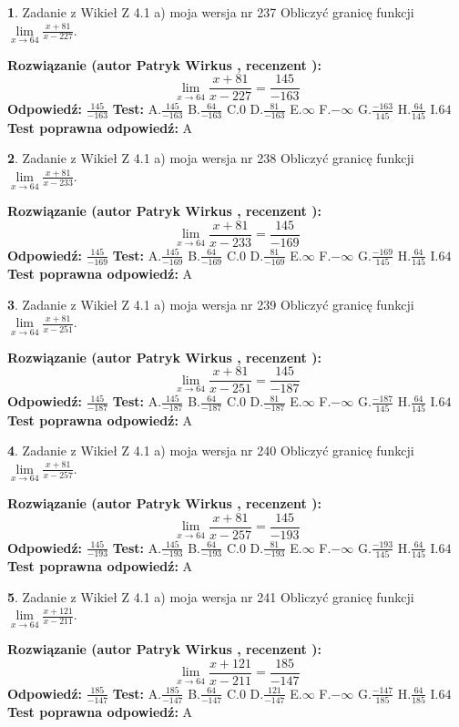 \documentclass[12pt, a4paper]{article}
\theoremstyle{definition} %
\newtheorem{zad}{}
\newcommand{\zadStart}[1]{\begin{zad}#1\newline}
\newcommand{\zadStop}{\end{zad}}
\newcommand{\rozwStart}[2]{\noindent \textbf{Rozwiązanie (autor #1 , recenzent #2): }\newline}
\newcommand{\rozwStop}{\newline}
\newcommand{\odpStart}{\noindent \textbf{Odpowiedź:}\newline}
\newcommand{\odpStop}{\newline}
\newcommand{\testStart}{\noindent \textbf{Test:}\newline}
\newcommand{\testStop}{\newline}
\newcommand{\kluczStart}{\noindent \textbf{Test poprawna odpowiedź:}\newline}
\newcommand{\kluczStop}{\newline}
\begin{document}
\zadStart{Zadanie z Wikieł Z 4.1 a) moja wersja nr 237}
Obliczyć granicę funkcji $\lim\limits_{x\to64}\frac{x+81}{x-227}$.
\zadStop
\rozwStart{Patryk Wirkus}{}
$$\lim\limits_{x\to64}\frac{x+81}{x-227} = \frac{145}{-163}$$
\rozwStop
\odpStart
$\frac{145}{-163}$
\odpStop
\testStart
A.$\frac{145}{-163}$
B.$\frac{64}{-163}$
C.$0$
D.$\frac{81}{-163}$
E.$\infty$
F.$-\infty$
G.$\frac{-163}{145}$
H.$\frac{64}{145}$
I.$64$
\testStop
\kluczStart
A
\kluczStop



\zadStart{Zadanie z Wikieł Z 4.1 a) moja wersja nr 238}
Obliczyć granicę funkcji $\lim\limits_{x\to64}\frac{x+81}{x-233}$.
\zadStop
\rozwStart{Patryk Wirkus}{}
$$\lim\limits_{x\to64}\frac{x+81}{x-233} = \frac{145}{-169}$$
\rozwStop
\odpStart
$\frac{145}{-169}$
\odpStop
\testStart
A.$\frac{145}{-169}$
B.$\frac{64}{-169}$
C.$0$
D.$\frac{81}{-169}$
E.$\infty$
F.$-\infty$
G.$\frac{-169}{145}$
H.$\frac{64}{145}$
I.$64$
\testStop
\kluczStart
A
\kluczStop



\zadStart{Zadanie z Wikieł Z 4.1 a) moja wersja nr 239}
Obliczyć granicę funkcji $\lim\limits_{x\to64}\frac{x+81}{x-251}$.
\zadStop
\rozwStart{Patryk Wirkus}{}
$$\lim\limits_{x\to64}\frac{x+81}{x-251} = \frac{145}{-187}$$
\rozwStop
\odpStart
$\frac{145}{-187}$
\odpStop
\testStart
A.$\frac{145}{-187}$
B.$\frac{64}{-187}$
C.$0$
D.$\frac{81}{-187}$
E.$\infty$
F.$-\infty$
G.$\frac{-187}{145}$
H.$\frac{64}{145}$
I.$64$
\testStop
\kluczStart
A
\kluczStop



\zadStart{Zadanie z Wikieł Z 4.1 a) moja wersja nr 240}
Obliczyć granicę funkcji $\lim\limits_{x\to64}\frac{x+81}{x-257}$.
\zadStop
\rozwStart{Patryk Wirkus}{}
$$\lim\limits_{x\to64}\frac{x+81}{x-257} = \frac{145}{-193}$$
\rozwStop
\odpStart
$\frac{145}{-193}$
\odpStop
\testStart
A.$\frac{145}{-193}$
B.$\frac{64}{-193}$
C.$0$
D.$\frac{81}{-193}$
E.$\infty$
F.$-\infty$
G.$\frac{-193}{145}$
H.$\frac{64}{145}$
I.$64$
\testStop
\kluczStart
A
\kluczStop



\zadStart{Zadanie z Wikieł Z 4.1 a) moja wersja nr 241}
Obliczyć granicę funkcji $\lim\limits_{x\to64}\frac{x+121}{x-211}$.
\zadStop
\rozwStart{Patryk Wirkus}{}
$$\lim\limits_{x\to64}\frac{x+121}{x-211} = \frac{185}{-147}$$
\rozwStop
\odpStart
$\frac{185}{-147}$
\odpStop
\testStart
A.$\frac{185}{-147}$
B.$\frac{64}{-147}$
C.$0$
D.$\frac{121}{-147}$
E.$\infty$
F.$-\infty$
G.$\frac{-147}{185}$
H.$\frac{64}{185}$
I.$64$
\testStop
\kluczStart
A
\kluczStop
\end{document}
